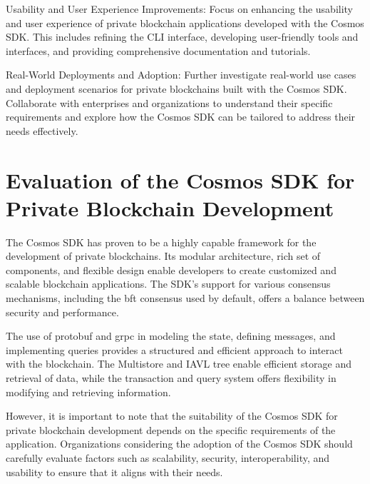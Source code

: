     Usability and User Experience Improvements: Focus on enhancing the usability and user experience of private blockchain applications developed with the Cosmos SDK. This includes refining the CLI interface, developing user-friendly tools and interfaces, and providing comprehensive documentation and tutorials.

    Real-World Deployments and Adoption: Further investigate real-world use cases and deployment scenarios for private blockchains built with the Cosmos SDK. Collaborate with enterprises and organizations to understand their specific requirements and explore how the Cosmos SDK can be tailored to address their needs effectively.

\section{Evaluation of the Cosmos SDK for Private Blockchain Development}

The Cosmos SDK has proven to be a highly capable framework for the development of private blockchains. Its modular architecture, rich set of components, and flexible design enable developers to create customized and scalable blockchain applications. The SDK's support for various consensus mechanisms, including the \gls{bft} consensus used by default, offers a balance between security and performance.

The use of protobuf and \gls{grpc} in modeling the state, defining messages, and implementing queries provides a structured and efficient approach to interact with the blockchain. The Multistore and IAVL tree enable efficient storage and retrieval of data, while the transaction and query system offers flexibility in modifying and retrieving information.

However, it is important to note that the suitability of the Cosmos SDK for private blockchain development depends on the specific requirements of the application. Organizations considering the adoption of the Cosmos SDK should carefully evaluate factors such as scalability, security, interoperability, and usability to ensure that it aligns with their needs.